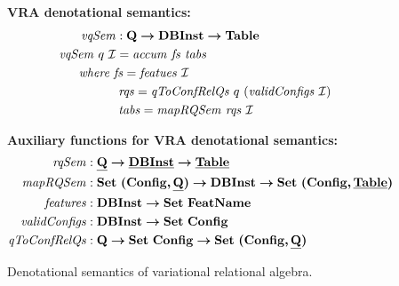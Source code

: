 \begin{figure}

\textbf{VRA denotational semantics:}
\begin{alignat*}{1}
\mathit{vqSem} &: \qSet \totype \vdbInstSet \totype \tabletype\\
\mathit{vqSem} \  \vQ \ \vdbInst &= \mathit{accum} \ \mathit{fs} \ \mathit{tabs}\\
&\hspace{-30pt}\textit{where } \mathit{fs} =\mathit{featues} \ \vdbInst\\
&\hspace{2pt} \mathit{rqs} = \mathit{qToConfRelQs} \ \vQ \ (\mathit{validConfigs} \ \vdbInst)\\
&\hspace{2pt} \mathit{tabs} = \mathit{mapRQSem} \ \mathit{rqs} \ \vdbInst
\end{alignat*}


\medskip 
\textbf{Auxiliary functions for VRA denotational semantics:}
\begin{alignat*}{1}
\mathit{rqSem} &: \pQSet \totype \pInstSet \totype \pTabSet\\
\mathit{mapRQSem} &: \settype {\typepair \confSet \pQSet} \totype \vdbInstSet \totype \settype {\typepair \confSet \pTabSet}\\
\mathit{features} &: \vdbInstSet \totype \settype \fSet\\
\mathit{validConfigs} &: \vdbInstSet \totype \settype \confSet\\
\mathit{qToConfRelQs} &: \qSet \totype \settype \confSet \totype \settype {\typepair \confSet \pQSet}\\
\end{alignat*}


\caption[VRA denotational semantics]{Denotational semantics of variational relational algebra.
}
\label{fig:densem}
\end{figure}

